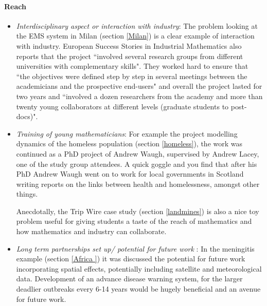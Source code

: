 \documentclass[11pt]{article} %
\begin{document}
\paragraph{Reach}
\begin{itemize}
	\item \textit{Interdisciplinary aspect or interaction with industry}: The problem looking at the EMS system in Milan (section \ref{Milan}) is a clear example of interaction with industry.  European Success Stories in Industrial Mathematics \cite{European2011} also reports that the project ``involved several research groups from different universities with complementary skills". They worked hard to ensure that ``the objectives were defined step by step in several meetings between the academicians and the prospective end-users" and overall the project lasted for two years and ``involved a dozen researchers from the academy and more than twenty young collaborators at different levels (graduate students to post-docs)".
	\item \textit{Training of young mathematicians}: For example the project modelling dynamics of the homeless population (section \ref{homeless}), the work was continued as a PhD project of Andrew Waugh, supervised by Andrew Lacey, one of the study group attendees. A quick goggle and you find that after his PhD Andrew Waugh went on to work for local governments in Scotland writing reports on the links between health and homelessness, amongst other things.
	
	Anecdotally, the Trip Wire case study (section \ref{landmines}) is also a nice toy problem useful for giving students a taste of the reach of mathematics and how mathematics and industry can collaborate. 
	\item \textit{Long term partnerships set up/ potential for future work }: In the meningitis example (section \ref{Africa }) it was discussed the potential for future work incorporating  spatial effects, potentially including satellite and meteorological data. Development of an advance disease warning system, for the larger deadlier outbreaks every 6-14 years would be hugely beneficial and an avenue for future work. 
\end{itemize}
	 
\end{document}
